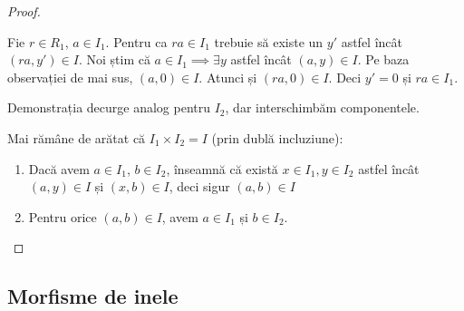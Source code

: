 \begin{proof}
\begin{itemize}
    Fie \(r \in R_1\), \(a \in I_1\). Pentru ca \(r a \in I_1\) trebuie să existe un \(y'\) astfel încât \((r a, y') \in I\). Noi știm că \(a \in I_1 \implies \exists y\) astfel încât \((a, y) \in I\). Pe baza observației de mai sus, \((a, 0) \in I\). Atunci și \((r a, 0) \in I\). Deci \(y' = 0\) și \(r a \in I_1\).
    
    Demonstrația decurge analog pentru \(I_2\), dar interschimbăm componentele.
    
    Mai rămâne de arătat că \(I_1 \times I_2 = I\) (prin dublă incluziune):
    \begin{enumerate}
        \item Dacă avem \(a \in I_1\), \(b \in I_2\), înseamnă că există \(x \in I_1, y \in I_2\) astfel încât \((a, y) \in I\) și \((x, b) \in I\), deci sigur \((a, b) \in I\)
        \item Pentru orice \((a, b) \in I\), avem \(a \in I_1\) și \(b \in I_2\).
    \end{enumerate}
\end{itemize}
\end{proof}

\begin{comment}
\begin{exercise}[2.8]
Fie \(R\) un inel unitar.
\begin{itemize}
    \item Să se arate că idealele bilaterale ale lui \(M_2(R)\) sunt de forma \(M_2(I)\) unde \(I\) este ideal bilateral al lui \(R\).
    \item Dați exemplu de ideal la stânga al lui \(M_2(R)\) care nu este de forma \(M_2(J)\), cu \(J\) ideal la stânga al lui \(R\).
\end{itemize}
\end{exercise}
\end{comment}

\subsection{Morfisme de inele}

\begin{comment}
\begin{exercise}[3.8]
Arătați că orice inel boolean finit nenul este izomorf cu \(\underbrace{\integersmod{2} \times \dots \times \integersmod{2}}_{\text{\(n\) ori}}\) pentru un \(n \in \naturals^*\).
\end{exercise}
\end{comment}

